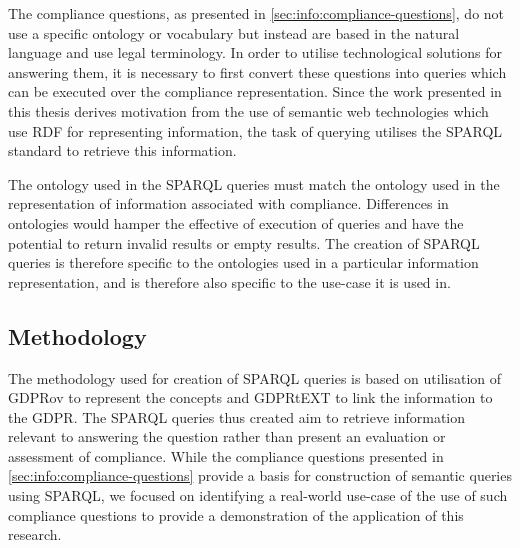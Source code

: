 The compliance questions, as presented in \autoref{sec:info:compliance-questions}, do not use a specific ontology or vocabulary but instead are based in the natural language and use legal terminology. In order to utilise technological solutions for answering them, it is necessary to first convert these questions into queries which can be executed over the compliance representation.
Since the work presented in this thesis derives motivation from the use of semantic web technologies which use RDF for representing information, the task of querying utilises the SPARQL standard to retrieve this information.

The ontology used in the SPARQL queries must match the ontology used in the representation of information associated with compliance. Differences in ontologies would hamper the effective of execution of queries and have the potential to return invalid results or empty results.
The creation of SPARQL queries is therefore specific to the ontologies used in a particular information representation, and is therefore also specific to the use-case it is used in.

\subsection{Methodology}\label{sec:testing:sparql:methodology}
The methodology used for creation of SPARQL queries is based on utilisation of GDPRov to represent the concepts and GDPRtEXT to link the information to the GDPR.
The SPARQL queries thus created aim to retrieve information relevant to answering the question rather than present an evaluation or assessment of compliance.
While the compliance questions presented in \autoref{sec:info:compliance-questions} provide a basis for construction of semantic queries using SPARQL, we focused on identifying a real-world use-case of the use of such compliance questions to provide a demonstration of the application of this research.

